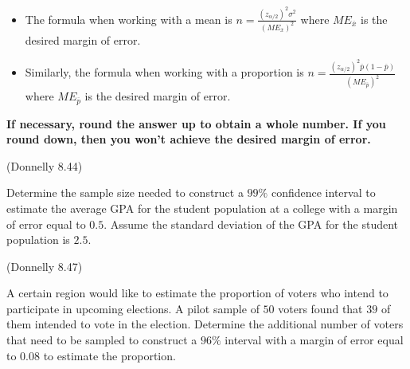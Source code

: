 \documentclass[12pt, letterpaper]{article}
\newcommand{\ds}{\displaystyle}
\newcounter{exercise}
\theoremstyle{definition}
\begin{document}
\begin{statement}
\begin{itemize}

\item The formula when working with a mean is $\ds n=\frac{(z_{\alpha/2})^2\sigma^2}{(ME_{\overline{x}})^2}$ where $ME_{\overline{x}}$ is the desired margin of error.

\item Similarly, the formula when working with a proportion is $\ds n=\frac{(z_{\alpha/2})^2\overline{p}(1-\overline{p})}{(ME_{\overline{p}})^2}$ where $ME_{\overline{p}}$ is the desired margin of error.

\end{itemize}

\noindent \textbf{If necessary, round the answer up to obtain a whole number.  If you round down, then you won't achieve the desired margin of error.}
\end{statement}

\begin{exercise}  (Donnelly 8.44)

Determine the sample size needed to construct a $99\%$ confidence interval to estimate the average GPA for the student population at a college with a margin of error equal to $0.5$.  Assume the standard deviation of the GPA for the student population is $2.5$.

\end{exercise}

\vfill
\vfill

\newpage


\begin{exercise}  (Donnelly 8.47)

A certain region would like to estimate the proportion of voters who intend to participate in upcoming elections.  A pilot sample of $50$ voters found that $39$ of them intended to vote in the election.  Determine the additional number of voters that need to be sampled to construct a $96\%$ interval with a margin of error equal to $0.08$ to estimate the proportion.

\end{exercise}

\vfill
\vfill
\end{document}

